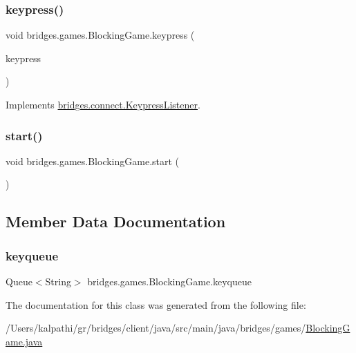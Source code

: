 \subsubsection{\texorpdfstring{keypress()}{keypress()}}
{\footnotesize\ttfamily void bridges.\+games.\+Blocking\+Game.\+keypress (\begin{DoxyParamCaption}\item[{J\+S\+O\+N\+Object}]{keypress }\end{DoxyParamCaption})}



Implements \mbox{\hyperlink{interfacebridges_1_1connect_1_1_keypress_listener_af713d94f36bce842f39ce0aea4db8da6}{bridges.\+connect.\+Keypress\+Listener}}.

\mbox{\label{classbridges_1_1games_1_1_blocking_game_a00f9ad93393ba18407940f24aaddfa21}} 
\subsubsection{\texorpdfstring{start()}{start()}}
{\footnotesize\ttfamily void bridges.\+games.\+Blocking\+Game.\+start (\begin{DoxyParamCaption}{ }\end{DoxyParamCaption})}



\subsection{Member Data Documentation}
\mbox{\label{classbridges_1_1games_1_1_blocking_game_a7a8057fd0e008879f89c86d929cc92e6}} 
\subsubsection{\texorpdfstring{keyqueue}{keyqueue}}
{\footnotesize\ttfamily Queue$<$String$>$ bridges.\+games.\+Blocking\+Game.\+keyqueue\hspace{0.3cm}{\ttfamily [protected]}}



The documentation for this class was generated from the following file\+:\begin{DoxyCompactItemize}
\item 
/\+Users/kalpathi/gr/bridges/client/java/src/main/java/bridges/games/\mbox{\hyperlink{_blocking_game_8java}{Blocking\+Game.\+java}}\end{DoxyCompactItemize}
